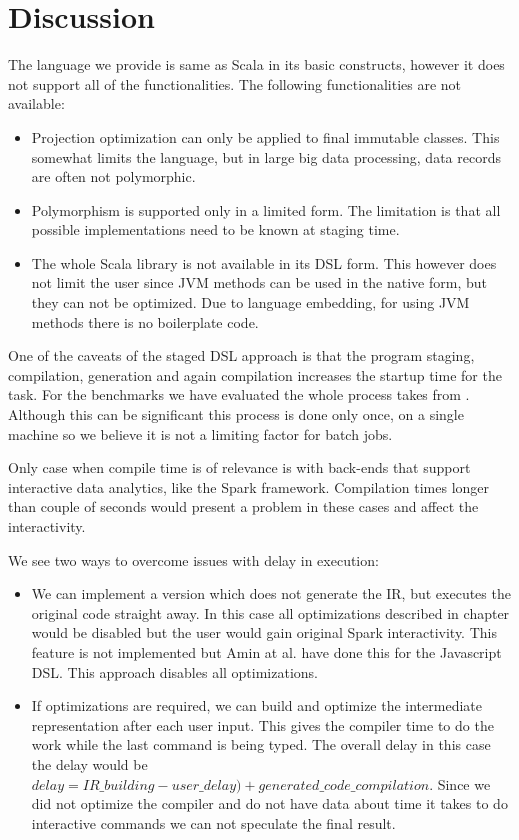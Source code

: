 \section{Discussion}
\label{sec:discussion}


The language we provide is same as Scala in its basic constructs, however it does not support all of the functionalities. The following functionalities are not available:  
\begin{itemize}
\item Projection optimization can only be applied to final immutable classes. This somewhat limits the language, but in large big data processing, data records are often not polymorphic. 
\item Polymorphism is supported only in a limited form. The limitation is that all possible implementations need to be known at staging time.
\item The whole Scala library is not available in its DSL form. This however does not limit the user since JVM methods can be used in the native form, but they can not be optimized. Due to language embedding, for using JVM methods there is no boilerplate code. 
\end{itemize}



One of the caveats of the staged DSL approach is that the program staging, compilation, generation and again compilation increases the startup time for the task. For the benchmarks we have evaluated the whole process takes from . Although this can be significant this process is done only once, on a single machine so we believe it is not a limiting factor for batch jobs.

Only case when compile time is of relevance is with back-ends that support interactive data analytics, like the Spark framework. Compilation times longer than couple of seconds would present a problem in these cases and affect the interactivity. 

We see two ways to overcome issues with delay in execution:
\begin{itemize}
\item We can implement a version which does not generate the IR, but executes the original code straight away. In this case all optimizations described in chapter would be disabled but the user would gain original Spark interactivity. This feature is not implemented but Amin at al.  have done this for the Javascript DSL. This approach disables all optimizations.

\item If optimizations are required,  we can build and optimize the intermediate representation after each user input. This gives the compiler time to do the work while the last command is being typed. The overall delay in this case the delay would be $delay = IR\_building - user\_delay) + generated\_code\_compilation$. Since we did not optimize the compiler and do not have data about time it takes to do interactive commands we can not speculate the final result.
\end{itemize}


